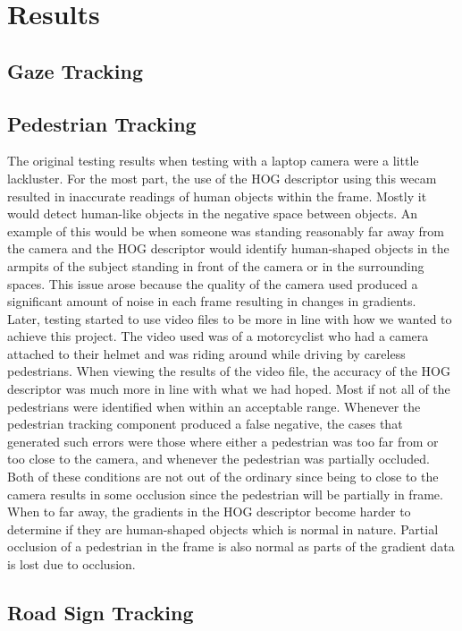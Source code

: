 \section{Results}

\subsection{Gaze Tracking}


\subsection{Pedestrian Tracking}
The original testing results when testing with a laptop camera were a little lackluster. For the most part, the use of the HOG descriptor using this wecam resulted in inaccurate readings of human objects within the frame. Mostly it would detect human-like objects in the negative space between objects. An example of this would be when someone was standing reasonably far away from the camera and the HOG descriptor would identify human-shaped objects in the armpits of the subject standing in front of the camera or in the surrounding spaces. This issue arose because the quality of the camera used produced a significant amount of noise in each frame resulting in changes in gradients.\\

Later, testing started to use video files to be more in line with how we wanted to achieve this project. The video used was of a motorcyclist who had a camera attached to their helmet and was riding around while driving by careless pedestrians. When viewing the results of the video file, the accuracy of the HOG descriptor was much more in line with what we had hoped. Most if not all of the pedestrians were identified when within an acceptable range. Whenever the pedestrian tracking component produced a false negative, the cases that generated such errors were those where either a pedestrian was too far from or too close to the camera, and whenever the pedestrian was partially occluded. Both of these conditions are not out of the ordinary since being to close to the camera results in some occlusion since the pedestrian will be partially in frame. When to far away, the gradients in the HOG descriptor become harder to determine if they are human-shaped objects which is normal in nature. Partial occlusion of a pedestrian in the frame is also normal as parts of the gradient data is lost due to occlusion.

\subsection{Road Sign Tracking}